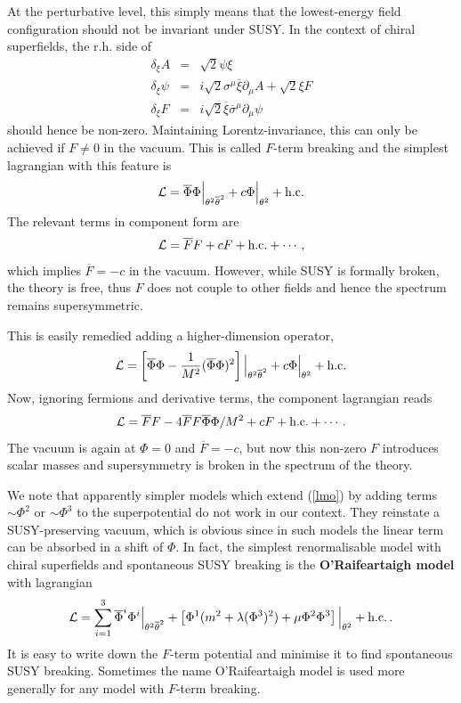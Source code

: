 \documentclass[12pt]{article}
\newcommand{\be}{\begin{equation}}
\newcommand{\ee}{\end{equation}}
\newcommand{\bea}{\begin{eqnarray}}
\newcommand{\eea}{\end{eqnarray}}
\newcommand{\ol}{\overline}
\numberwithin{equation}{section}
\begin{document}
At the perturbative level, this simply means that the lowest-energy field configuration should not be invariant under SUSY. In the context of chiral superfields, the r.h. side of 
\bea
\delta_\xi A&=&\sqrt{2}\psi\xi
\nonumber \\
\delta_\xi\psi&=&i\sqrt{2}\sigma^\mu\ol{\xi}\partial_\mu A+\sqrt{2}\xi F
\\
\delta_\xi F&=&i\sqrt{2}\ol{\xi}\ol{\sigma}^\mu\partial_\mu \psi \nonumber
\eea
should hence be non-zero. Maintaining Lorentz-invariance, this can only be achieved if $F\neq 0$ in the vacuum. This is called $F$-term breaking and the simplest lagrangian with this feature is 
\be
{\cal L}=\ol{\Phi}\Phi\Big|_{\theta^2\ol{\theta}^2}+c\Phi\Big|_{\theta^2}
+ \mbox{h.c.}\label{lmo}
\ee
The relevant terms in component form are 
\be
{\cal L}=\ol{F}F+cF+\mbox{h.c.}+\cdots\,,
\ee
which implies $\ol{F}=-c$ in the vacuum. However, while SUSY is formally broken, the theory is free, thus $F$ does not couple to other fields and hence the spectrum remains supersymmetric. 

This is easily remedied adding a higher-dimension operator, 
\be
{\cal L}=\left[\ol{\Phi}\Phi-\frac{1}{M^2}(\ol{\Phi}\Phi)^2\right] 
\Big|_{\theta^2\ol{\theta}^2}+c\Phi\Big|_{\theta^2} + \mbox{h.c.}
\ee
Now, ignoring fermions and derivative terms, the component lagrangian reads 
\be
{\cal L}=\ol{F}F-4\ol{F}F\ol{\Phi}\Phi/M^2+cF+\mbox{h.c.}+\cdots\,.
\ee
The vacuum is again at $\Phi=0$ and $\ol{F}=-c$, but now this non-zero $F$ introduces scalar masses and supersymmetry is broken in the spectrum of the theory. 

We note that apparently simpler models which extend (\ref{lmo}) by adding terms $\sim \Phi^2$ or $\sim \Phi^3$ to the superpotential do not work in our context. They reinstate a SUSY-preserving vacuum, which is obvious since in such models the linear term can be absorbed in a shift of $\Phi$. In fact, the simplest renormalisable model with chiral superfields and spontaneous SUSY breaking is the {\bf O'Raifeartaigh model} with lagrangian \cite{ORaifeartaigh:1975nky}
\be
{\cal L}=\sum_{i=1}^3 \ol{\Phi}^i\Phi^i \Big|_{\theta^2\ol{\theta}^2}+
\left[\Phi^1(m^2+\lambda(\Phi^3)^2)+\mu\Phi^2\Phi^3\right]
\Big|_{\theta^2} + \mbox{h.c.}\,.
\ee
It is easy to write down the $F$-term potential and minimise it to find spontaneous SUSY breaking. Sometimes the name  O'Raifeartaigh model is used more generally for any model with $F$-term breaking.  
\end{document}
